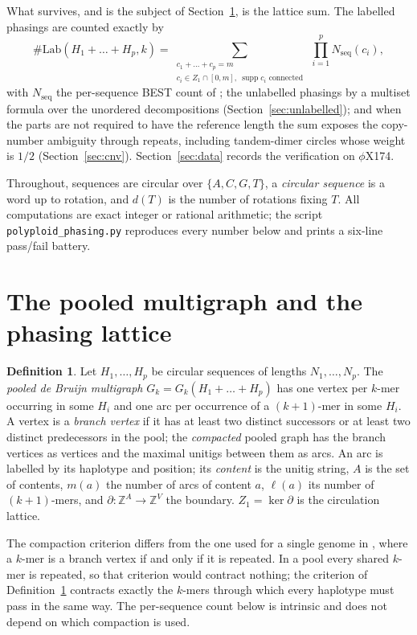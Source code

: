 \documentclass[11pt]{article}
\theoremstyle{plain}
\theoremstyle{definition}
\newtheorem{definition}[theorem]{Definition}
\theoremstyle{remark}
\newcommand{\Z}{\mathbb{Z}}
\newcommand{\supp}{\operatorname{supp}}
\newcommand{\Nseq}{N_{\mathrm{seq}}}
\newcommand{\Lab}{\#\mathrm{Lab}}
\begin{document}
What survives, and is the subject of Section~\ref{sec:lattice}, is the lattice sum. The
labelled phasings are counted exactly by
\[
  \Lab(H_1{+}\dots{+}H_p,k)=\sum_{\substack{c_1+\dots+c_p=m\\ c_i\in Z_1\cap[0,m],\ \supp c_i
  \text{ connected}}}\ \prod_{i=1}^p\Nseq(c_i),
\]
with $\Nseq$ the per-sequence BEST count of \cite{Bio8}; the unlabelled phasings by a multiset
formula over the unordered decompositions (Section~\ref{sec:unlabelled}); and when the parts
are not required to have the reference length the sum exposes the copy-number ambiguity
through repeats, including tandem-dimer circles whose weight is $1/2$ (Section~\ref{sec:cnv}).
Section~\ref{sec:data} records the verification on $\phi$X174.

Throughout, sequences are circular over $\{A,C,G,T\}$, a \emph{circular sequence} is a word
up to rotation, and $d(T)$ is the number of rotations fixing $T$. All computations are exact
integer or rational arithmetic; the script \texttt{polyploid\_phasing.py} reproduces every
number below and prints a six-line pass/fail battery.

\section{The pooled multigraph and the phasing lattice}\label{sec:lattice}

\begin{definition}\label{def:pool}
Let $H_1,\dots,H_p$ be circular sequences of lengths $N_1,\dots,N_p$. The \emph{pooled de
Bruijn multigraph} $G_k=G_k(H_1{+}\dots{+}H_p)$ has one vertex per $k$-mer occurring in some
$H_i$ and one arc per occurrence of a $(k{+}1)$-mer in some $H_i$. A vertex is a \emph{branch
vertex} if it has at least two distinct successors or at least two distinct predecessors in
the pool; the \emph{compacted} pooled graph has the branch vertices as vertices and the
maximal unitigs between them as arcs. An arc is labelled by its haplotype and position; its
\emph{content} is the unitig string, $A$ is the set of contents, $m(a)$ the number of arcs of
content $a$, $\ell(a)$ its number of $(k{+}1)$-mers, and $\partial\colon\Z^A\to\Z^V$ the
boundary. $Z_1=\ker\partial$ is the circulation lattice.
\end{definition}

The compaction criterion differs from the one used for a single genome in \cite{Bio5}, where a
$k$-mer is a branch vertex if and only if it is repeated. In a pool every shared $k$-mer is
repeated, so that criterion would contract nothing; the criterion of
Definition~\ref{def:pool} contracts exactly the $k$-mers through which every haplotype must
pass in the same way. The per-sequence count below is intrinsic and does not depend on which
compaction is used.
\end{document}
